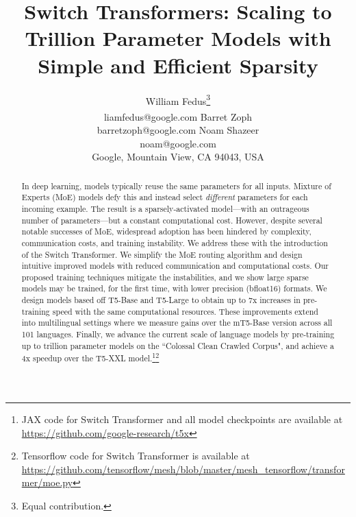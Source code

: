 \documentclass[twoside,11pt]{article}
\makeatletter
\newcommand{\printfnsymbol}[1]{%
  \textsuperscript{\@fnsymbol{#1}}%
}
\makeatother
\begin{document}
\title{Switch Transformers: Scaling to Trillion Parameter Models with Simple and Efficient Sparsity}


\author{\name William Fedus\thanks{Equal contribution.} \\
\email liamfedus@google.com
\AND    
\name Barret Zoph\printfnsymbol{1} \\
\email barretzoph@google.com
\AND
\name Noam Shazeer \\
\email noam@google.com \\
\addr Google, Mountain View, CA 94043, USA
}


\maketitle

\begin{abstract}%
In deep learning, models typically reuse the same parameters for all inputs.
Mixture of Experts (MoE) models defy this and instead select \emph{different} parameters for each incoming example.
The result is a sparsely-activated model---with an outrageous number of parameters---but a constant computational cost.
However, despite several notable successes of MoE, widespread adoption has been hindered by  complexity, communication costs, and training instability.
We address these with the introduction of the Switch Transformer.
We simplify the MoE routing algorithm and design intuitive improved models with reduced communication and computational costs.
Our proposed training techniques mitigate the instabilities, and we show large sparse models may be trained, for the first time, with lower precision (bfloat16) formats.
We design models based off T5-Base and T5-Large \citep{raffel2019exploring} to obtain up to 7x increases in pre-training speed with the same computational resources.
These improvements extend into multilingual settings where we measure gains over the mT5-Base version across all 101 languages.
Finally, we advance the current scale of language models by pre-training up to trillion parameter models on the ``Colossal Clean Crawled Corpus", and achieve a 4x speedup over the T5-XXL model.\footnote{JAX code for Switch Transformer and all model checkpoints are available at \url{https://github.com/google-research/t5x}}\footnote{Tensorflow code for Switch Transformer is available at  \url{https://github.com/tensorflow/mesh/blob/master/mesh_tensorflow/transformer/moe.py}}
\end{abstract}
\end{document}
